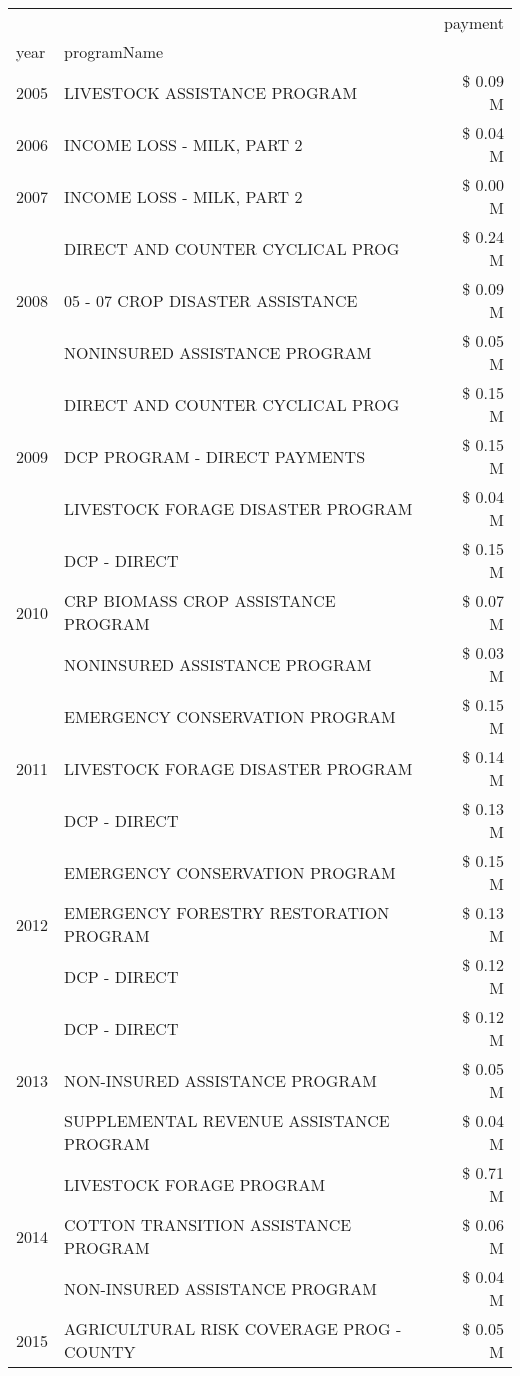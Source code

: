 \begin{tabular}{llr}
\toprule
 &  & payment \\
year & programName &  \\
\midrule
2005 & LIVESTOCK ASSISTANCE PROGRAM & \$ 0.09 M \\
\cline{1-3}
2006 & INCOME LOSS - MILK, PART 2 & \$ 0.04 M \\
\cline{1-3}
2007 & INCOME LOSS - MILK, PART 2 & \$ 0.00 M \\
\cline{1-3}
\multirow[t]{3}{*}{2008} & DIRECT AND COUNTER CYCLICAL PROG & \$ 0.24 M \\
 & 05 - 07 CROP DISASTER ASSISTANCE & \$ 0.09 M \\
 & NONINSURED ASSISTANCE PROGRAM & \$ 0.05 M \\
\cline{1-3}
\multirow[t]{3}{*}{2009} & DIRECT AND COUNTER CYCLICAL PROG & \$ 0.15 M \\
 & DCP PROGRAM - DIRECT PAYMENTS & \$ 0.15 M \\
 & LIVESTOCK FORAGE DISASTER  PROGRAM & \$ 0.04 M \\
\cline{1-3}
\multirow[t]{3}{*}{2010} & DCP - DIRECT & \$ 0.15 M \\
 & CRP BIOMASS CROP ASSISTANCE PROGRAM & \$ 0.07 M \\
 & NONINSURED ASSISTANCE PROGRAM & \$ 0.03 M \\
\cline{1-3}
\multirow[t]{3}{*}{2011} & EMERGENCY CONSERVATION PROGRAM & \$ 0.15 M \\
 & LIVESTOCK FORAGE DISASTER PROGRAM & \$ 0.14 M \\
 & DCP - DIRECT & \$ 0.13 M \\
\cline{1-3}
\multirow[t]{3}{*}{2012} & EMERGENCY CONSERVATION PROGRAM & \$ 0.15 M \\
 & EMERGENCY FORESTRY RESTORATION PROGRAM & \$ 0.13 M \\
 & DCP - DIRECT & \$ 0.12 M \\
\cline{1-3}
\multirow[t]{3}{*}{2013} & DCP - DIRECT & \$ 0.12 M \\
 & NON-INSURED ASSISTANCE PROGRAM & \$ 0.05 M \\
 & SUPPLEMENTAL REVENUE ASSISTANCE PROGRAM & \$ 0.04 M \\
\cline{1-3}
\multirow[t]{3}{*}{2014} & LIVESTOCK FORAGE PROGRAM & \$ 0.71 M \\
 & COTTON TRANSITION ASSISTANCE PROGRAM & \$ 0.06 M \\
 & NON-INSURED ASSISTANCE PROGRAM & \$ 0.04 M \\
\cline{1-3}
\multirow[t]{3}{*}{2015} & AGRICULTURAL RISK COVERAGE PROG - COUNTY & \$ 0.05 M \\

\end{tabular}
